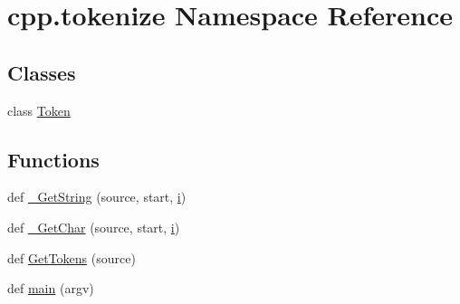 \hypertarget{namespacecpp_1_1tokenize}{}\section{cpp.\+tokenize Namespace Reference}
\label{namespacecpp_1_1tokenize}
\subsection*{Classes}
\begin{DoxyCompactItemize}
\item 
class \mbox{\hyperlink{classcpp_1_1tokenize_1_1_token}{Token}}
\end{DoxyCompactItemize}
\subsection*{Functions}
\begin{DoxyCompactItemize}
\item 
def \mbox{\hyperlink{namespacecpp_1_1tokenize_a3c6a8b154110b4b6a0385ccc3469db77}{\+\_\+\+Get\+String}} (source, start, \mbox{\hyperlink{_obj__test_2lib_2googletest-master_2googlemock_2test_2gmock-matchers__test_8cc_acb559820d9ca11295b4500f179ef6392}{i}})
\item 
def \mbox{\hyperlink{namespacecpp_1_1tokenize_abeb75f493bd3035922daf150f5213ba9}{\+\_\+\+Get\+Char}} (source, start, \mbox{\hyperlink{_obj__test_2lib_2googletest-master_2googlemock_2test_2gmock-matchers__test_8cc_acb559820d9ca11295b4500f179ef6392}{i}})
\item 
def \mbox{\hyperlink{namespacecpp_1_1tokenize_ab78959b4d0a9c3bade98904a23129afc}{Get\+Tokens}} (source)
\item 
def \mbox{\hyperlink{namespacecpp_1_1tokenize_ae666c331b4bd7d1f3e8956c78cc6f3a4}{main}} (argv)
\end{DoxyCompactItemize}
